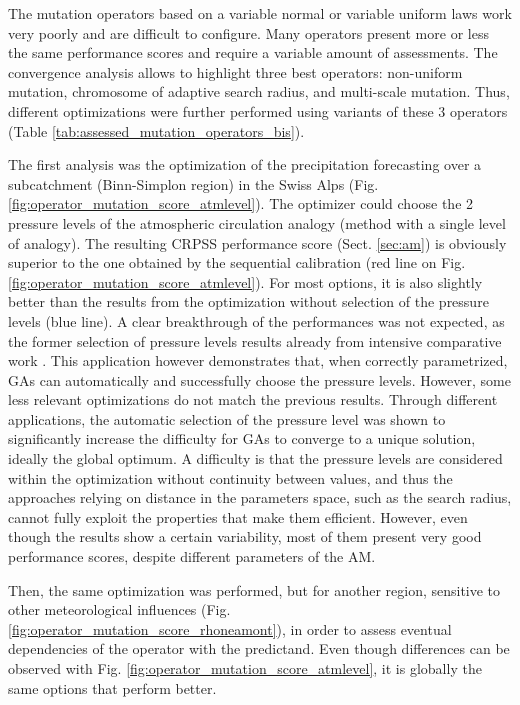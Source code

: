 \documentclass{ametsoc}
\begin{document}
The mutation operators based on a variable normal or variable uniform laws work very poorly and are difficult to configure. Many operators present more or less the same performance scores and require a variable amount of assessments. The convergence analysis \citep[see][]{Horton2012a} allows to highlight three best operators: non-uniform mutation, chromosome of adaptive search radius, and multi-scale mutation. Thus, different optimizations were further performed using variants of these 3 operators (Table \ref{tab:assessed_mutation_operators_bis}).

The first analysis was the optimization of the precipitation forecasting over a subcatchment (Binn-Simplon region) in the Swiss Alps (Fig. \ref{fig:operator_mutation_score_atmlevel}). The optimizer could choose the 2 pressure levels of the atmospheric circulation analogy (method with a single level of analogy). The resulting CRPSS performance score (Sect. \ref{sec:am}) is obviously superior to the one obtained by the sequential calibration (red line on Fig. \ref{fig:operator_mutation_score_atmlevel}). For most options, it is also slightly better than the results from the optimization without selection of the pressure levels (blue line). A clear breakthrough of the performances was not expected, as the former selection of pressure levels results already from intensive comparative work \citep{Bontron2004}. This application however demonstrates that, when correctly parametrized, GAs can automatically and successfully choose the pressure levels. However, some less relevant optimizations do not match the previous results. Through different applications, the automatic selection of the pressure level was shown to significantly increase the difficulty for GAs to converge to a unique solution, ideally the global optimum. A difficulty is that the pressure levels are considered within the optimization without continuity between values, and thus the approaches relying on distance in the parameters space, such as the search radius, cannot fully exploit the properties that make them efficient. However, even though the results show a certain variability, most of them present very good performance scores, despite different parameters of the AM.

Then, the same optimization was performed, but for another region, sensitive to other meteorological influences (Fig. \ref{fig:operator_mutation_score_rhoneamont}), in order to assess eventual dependencies of the operator with the predictand. Even though differences can be observed with Fig. \ref{fig:operator_mutation_score_atmlevel}, it is globally the same options that perform better.
\end{document}
